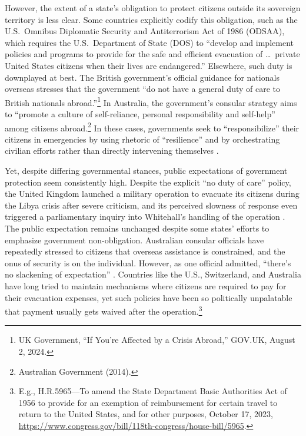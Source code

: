 \documentclass[12pt]{article}
\begin{document}
However, the extent of a state's obligation to protect citizens outside its sovereign territory is less clear. Some countries explicitly codify this obligation, such as the U.S.\ Omnibus Diplomatic Security and Antiterrorism Act of 1986 (ODSAA), which requires the U.S.\ Department of State (DOS) to ``develop and implement policies and programs to provide for the safe and efficient evacuation of \ldots\ private United States citizens when their lives are endangered.'' Elsewhere, such duty is downplayed at best. The British government's official guidance for nationals overseas stresses that the government ``do not have a general duty of care to British nationals abroad.''\footnote{UK Government, ``If You're Affected by a Crisis Abroad,'' GOV.UK, August 2, 2024.} In Australia, the government's consular strategy aims to ``promote a culture of self-reliance, personal responsibility and self-help'' among citizens abroad.\footnote{Australian Government (2014).} In these cases, governments seek to ``responsibilize'' their citizens in emergencies by using rhetoric of ``resilience'' and by orchestrating civilian efforts rather than directly intervening themselves \citep{Lowenheim2007}.

Yet, despite differing governmental stances, public expectations of government protection seem consistently high. Despite the explicit ``no duty of care'' policy, the United Kingdom launched a military operation to evacuate its citizens during the Libya crisis after severe criticism, and its perceived slowness of response even triggered a parliamentary inquiry into Whitehall's handling of the operation \citep{Schwarck2016}. The public expectation remains unchanged despite some states' efforts to emphasize government non-obligation. Australian consular officials have repeatedly stressed to citizens that overseas assistance is constrained, and the onus of security is on the individual. However, as one official admitted, ``there's no slackening of expectation'' \citep{Bond2016}. Countries like the U.S., Switzerland, and Australia have long tried to maintain mechanisms where citizens are required to pay for their evacuation expenses, yet such policies have been so politically unpalatable that payment usually gets waived after the operation.\footnote{E.g., H.R.5965---To amend the State Department Basic Authorities Act of 1956 to provide for an exemption of reimbursement for certain travel to return to the United States, and for other purposes, October 17, 2023, \url{https://www.congress.gov/bill/118th-congress/house-bill/5965}.}
\end{document}
